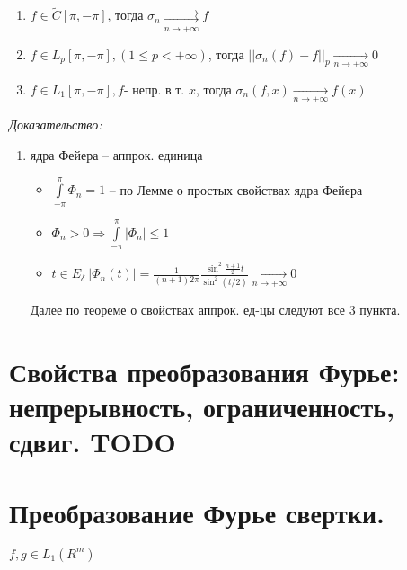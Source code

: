 \documentclass[paper=a4, fontsize=17pt]{article}
\begin{document}
	\begin{enumerate}
		\item $ f \in \widetilde{C}[\pi, -\pi] $, тогда $ \sigma_n \underset{n \rightarrow +\infty}{\rightrightarrows} f$

		\item $ f \in L_p[\pi, -\pi], (1 \leq p < +\infty)$, тогда $ ||\sigma_n(f) - f||_p \underset{n \rightarrow +\infty}{\rightarrow} 0 $

		\item $ f \in L_1[\pi, -\pi], f $- непр. в т. $x$, тогда $ \sigma_n(f, x) \underset{n \rightarrow +\infty}{\rightarrow} f(x) $
	\end{enumerate}

	\emph{Доказательство:}

	\begin{enumerate}
		\item ядра Фейера -- аппрок. единица
		\begin{itemize}
			\item $ \int\limits_{-\pi}^{\pi} \Phi_n  = 1 $ -- по Лемме о простых свойствах ядра Фейера
			\item $  \Phi_n > 0 \Rightarrow \int\limits_{-\pi}^{\pi} |\Phi_n | \leq 1$
			\item $ t \in E_{\delta} ~ | \Phi_n(t)| = \frac{1}{(n+1)2\pi}\frac{\sin^2\frac{n + 1}{2}t}{\sin^2(t/2)} \underset{n \rightarrow +\infty}{\rightarrow} 0 $
		\end{itemize}

		Далее по теореме о свойствах аппрок. ед-цы следуют все 3 пункта.

	\end{enumerate}

\section{Свойства преобразования Фурье: непрерывность, ограниченность, сдвиг. TODO}

\section{Преобразование Фурье свертки.}
	$ f, g \in L_1(R^m) $
\end{document}
